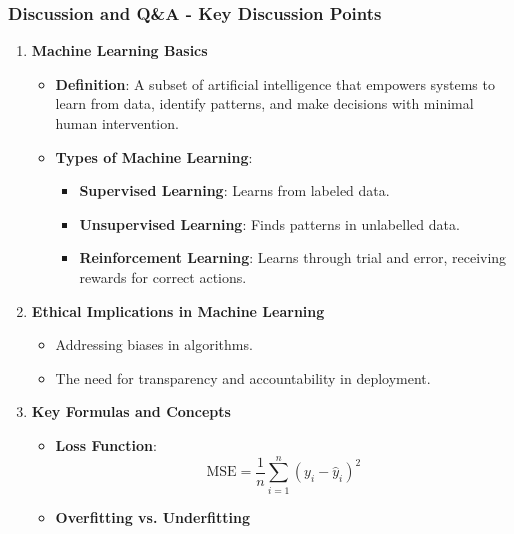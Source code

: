 \documentclass[aspectratio=169]{beamer}
\begin{document}
\begin{frame}[fragile]
    \frametitle{Discussion and Q\&A - Key Discussion Points}
    \begin{enumerate}
        \item \textbf{Machine Learning Basics}
            \begin{itemize}
                \item \textbf{Definition}: A subset of artificial intelligence that empowers systems to learn from data, identify patterns, and make decisions with minimal human intervention.
                \item \textbf{Types of Machine Learning}:
                    \begin{itemize}
                        \item \textbf{Supervised Learning}: Learns from labeled data. 
                        \item \textbf{Unsupervised Learning}: Finds patterns in unlabelled data. 
                        \item \textbf{Reinforcement Learning}: Learns through trial and error, receiving rewards for correct actions.
                    \end{itemize}
            \end{itemize}
        
        \item \textbf{Ethical Implications in Machine Learning}
            \begin{itemize}
                \item Addressing biases in algorithms.
                \item The need for transparency and accountability in deployment.
            \end{itemize}
        
        \item \textbf{Key Formulas and Concepts}
            \begin{itemize}
                \item \textbf{Loss Function}:
                    \[
                    \text{MSE} = \frac{1}{n} \sum_{i=1}^{n} (y_i - \hat{y}_i)^2
                    \]
                \item \textbf{Overfitting vs. Underfitting}
            \end{itemize}
    \end{enumerate}
\end{frame}
\end{document}

